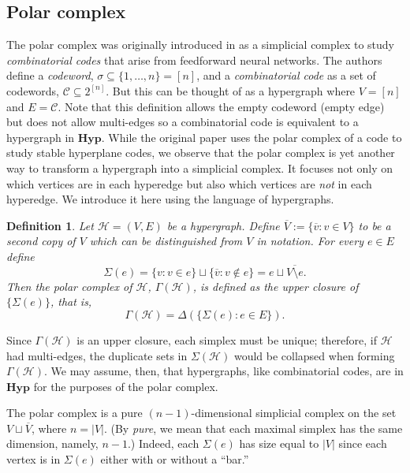 \documentclass{amsart}
\newtheorem{definition}[theorem]{Definition}
\newcommand{\Hyp}{\mathrm{\textbf{Hyp}}}
\renewcommand{\H}{\mathcal{H}}
\newcommand{\pol}{\Gamma}
\newcommand{\cLZ}[1]{{\textcolor{magenta}{[Comment from Lori: #1]}}}
\newcommand{\cEP}[1]{{\textcolor{blue}{[Comment from Emilie: #1]}}}
\begin{document}
\subsection{Polar complex}
\label{sec:polar}
The polar complex was originally introduced in \cite[Definition 4]{itskov2020hyperplane} as a simplicial complex to study \emph{combinatorial codes} that arise from feedforward neural networks. The authors define a \emph{codeword}, $\sigma \subseteq \{1, \ldots, n\}=[n]$, and a \emph{combinatorial code} as a set of codewords, $\mathcal{C} \subseteq 2^{[n]}$. But this can be thought of as a hypergraph where $V=[n]$ and $E=\mathcal{C}$. Note that this definition allows the empty codeword (empty edge) but does not allow multi-edges so a combinatorial code is equivalent to a hypergraph in $\Hyp$. While the original paper uses the polar complex of a code to study stable hyperplane codes, we observe that the polar complex is yet another way to transform a hypergraph into a simplicial complex. It focuses not only on which vertices are in each hyperedge but also which vertices are \emph{not} in each hyperedge. We introduce it here using the language of hypergraphs.
\begin{definition}
\label{def:polar}
    Let $\H=(V, E)$ be a hypergraph. Define $\overline{V} := \{\overline{v} : v \in V\}$ to be a second copy of $V$ which can be distinguished from $V$ in notation. For every $e \in E$ define 
    \[ \Sigma(e) = \{v : v \in e\} \sqcup \{ \overline{v} : v \not\in e\} = e \sqcup \overline{V\setminus e}.\]
    Then the \emph{polar complex} of $\H$, $\pol(\H)$, is defined as the upper closure of $\{ \Sigma(e)\}$, that is, 
    \[ \pol(\H) = \Delta(\{ \Sigma(e) : e \in E \}).\]
\end{definition}
\noindent Since $\Gamma(\H)$ is an upper closure, each simplex must be unique; therefore, if $\H$ had multi-edges, the duplicate sets in $\Sigma(\H)$ would be collapsed when forming $\Gamma(\H)$. We may assume, then, that hypergraphs, like combinatorial codes, are in $\Hyp$ for the purposes of the polar complex.

The polar complex is a pure $(n-1)$-dimensional simplicial complex on the set $V\sqcup \overline{V}$, where $n=|V|$. (By \emph{pure}, we mean that each maximal simplex has the same dimension, namely, $n-1$.) Indeed, each $\Sigma(e)$ has size equal to $|V|$ since each vertex is in $\Sigma(e)$ either with or without a ``bar.'' 
\end{document}
